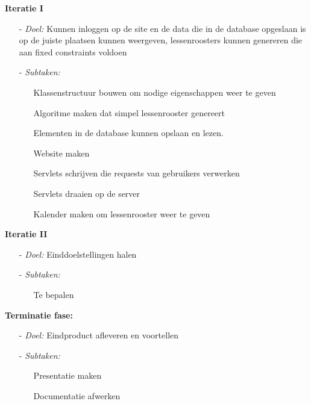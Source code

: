\documentclass{article}
\begin{document}
\textbf{Iteratie I}
\begin{itemize}
\item[-] \textit{Doel:} Kunnen inloggen op de site en de data die in de database opgeslaan is op de juiste plaatsen kunnen weergeven, lessenroosters kunnen genereren die aan fixed constraints voldoen\\[-5mm]
\item[-] \textit{Subtaken:} \\[-5mm]
\begin{itemize}
	\item[] Klassenstructuur bouwen om nodige eigenschappen weer te geven \\[-5mm]
	\item[] Algoritme maken dat simpel lessenrooster genereert \\[-5mm]
	\item[] Elementen in de database kunnen opslaan en lezen. \\[-5mm]
	\item[] Website maken \\[-5mm]
	\item[] Servlets schrijven die requests van gebruikers verwerken \\[-5mm]
	\item[] Servlets draaien op de server \\[-5mm]
	\item[] Kalender maken om lessenrooster weer te geven \\[-5mm]
\end{itemize}
\end{itemize}

\textbf{Iteratie II}
\begin{itemize}
\item[-] \textit{Doel:} Einddoelstellingen halen\\[-5mm]
\item[-] \textit{Subtaken:}\\[-5mm]
\begin{itemize}
	\item[] Te bepalen \\[-5mm]
\end{itemize}
\end{itemize}

\textbf{Terminatie fase:}
\begin{itemize}
\item[-] \textit{Doel:} Eindproduct afleveren en voortellen \\[-5mm]
\item[-] \textit{Subtaken:}\\[-5mm]
\begin{itemize}
	\item[] Presentatie maken \\[-5mm]
	\item[] Documentatie afwerken \\[-5mm]
\end{itemize}
\end{itemize}
\end{document}
